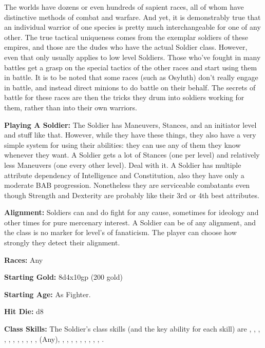 
The worlds have dozens or even hundreds of sapient races, all of whom have distinctive methods of combat and warfare. And yet, it is demonstrably true that an individual warrior of one species is pretty much interchangeable for one of any other. The true tactical uniqueness comes from the exemplar soldiers of these empires, and those are the dudes who have the actual Soldier class. However, even that only usually applies to low level Soldiers. Those who've fought in many battles get a grasp on the special tactics of the other races and start using them in battle. It is to be noted that some races (such as Osyluth) don't really engage in battle, and instead direct minions to do battle on their behalf. The secrets of battle for these races are then the tricks they drum into soldiers working for them, rather than into their own warriors.

\textbf{Playing A Soldier:} The Soldier has Maneuvers, Stances, and an initiator level and stuff like that. However, while they have these things, they also have a very simple system for using their abilities: they can use any of them they know whenever they want. A Soldier gets a lot of Stances (one per level) and relatively less Maneuvers (one every other level). Deal with it. A Soldier has multiple attribute dependency of Intelligence and Constitution, also they have only a moderate BAB progression. Nonetheless they are serviceable combatants even though Strength and Dexterity are probably like their 3rd or 4th best attributes.

\textbf{Alignment:} Soldiers can and do fight for any cause, sometimes for ideology and other times for pure mercenary interest. A Soldier can be of any alignment, and the class is no marker for level's of fanaticism. The player can choose how strongly they detect their alignment.

\textbf{Races:} Any

\textbf{Starting Gold:} 8d4x10gp (200 gold)

\textbf{Starting Age:} As Fighter.

\textbf{Hit Die:} d8

\textbf{Class Skills:} The Soldier's class skills (and the key ability for each skill) are , , , , , , , , , , ,  (Any), , , , , , , , , , .

